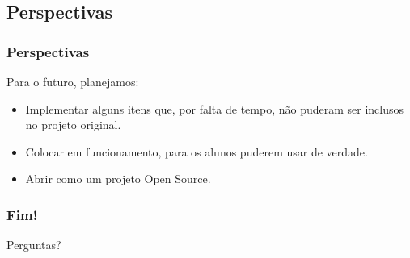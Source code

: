 \documentclass[11pt]{beamer}
\def\gap{\vspace{0.1in}}
\begin{document}
	\subsection{Perspectivas}
	\begin{frame}
		\frametitle{Perspectivas}
		Para o futuro, planejamos:

		\gap
		\begin{itemize}
			\item Implementar alguns itens que, por falta de tempo, não puderam
			ser inclusos no projeto original.
			\item Colocar em funcionamento, para os alunos puderem usar de
			verdade.
			\item Abrir como um projeto Open Source.
		\end{itemize}
	\end{frame}

\begin{frame}
	\frametitle{Fim!}
	\begin{center}\huge{\alert{Perguntas?}}\end{center}
\end{frame}
\end{document}

